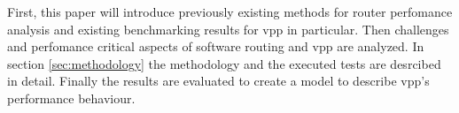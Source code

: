 
First, this paper will introduce previously existing methods for
router perfomance analysis and existing benchmarking results for
\Ac{vpp} in particular. Then challenges and perfomance critical
aspects of software routing and \Ac{vpp} are analyzed. In section
\ref{sec:methodology} the methodology and the executed tests are
desrcibed in detail. Finally the results are evaluated to create a
model to describe \Ac{vpp}'s performance behaviour.
